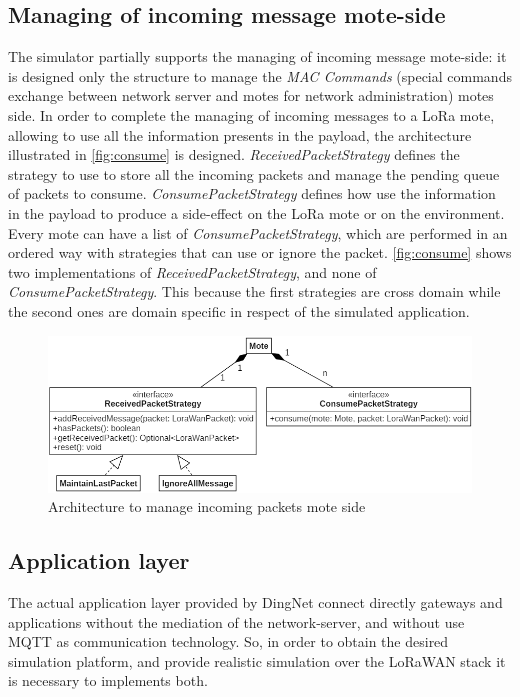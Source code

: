 \subsection*{Managing of incoming message mote-side}

The simulator partially supports the managing of incoming message mote-side: it is designed only the structure to manage the \textit{MAC Commands} (special commands exchange between network server and motes for network administration) motes side.
In order to complete the managing of incoming messages to a LoRa mote, allowing to use all the information presents in the payload, the architecture illustrated in \autoref{fig:consume} is designed.
\mbox{\textit{ReceivedPacketStrategy}} defines the strategy to use to store all the incoming packets and manage the pending queue of packets to consume.
\mbox{\textit{ConsumePacketStrategy}} defines how use the information in the payload to produce a side-effect on the LoRa mote or on the environment. 
Every mote can have a list of \mbox{\textit{ConsumePacketStrategy}}, which are performed in an ordered way with strategies that can use or ignore the packet.
\autoref{fig:consume} shows two implementations of \mbox{\textit{ReceivedPacketStrategy}}, and none of \mbox{\textit{ConsumePacketStrategy}}. This because the first strategies are cross domain while the second ones are domain specific in respect of the simulated application.
% 
\begin{figure}[h]
    \centering
    \includegraphics[width=\textwidth]{figures/consumePacket.png}
    \caption{Architecture to manage incoming packets mote side}
    \label{fig:consume}
\end{figure}
% 

\subsection*{Application layer}
The actual application layer provided by DingNet connect directly gateways and applications without the mediation of the network-server, and without use MQTT as communication technology.
So, in order to obtain the desired simulation platform, and provide realistic simulation over the LoRaWAN stack it is necessary to implements both.

